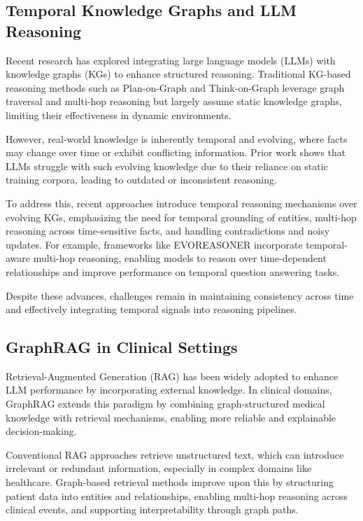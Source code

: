 \documentclass[conference]{IEEEtran}
\begin{document}
\subsection{Temporal Knowledge Graphs and LLM Reasoning}
Recent research has explored integrating large language models (LLMs) with knowledge graphs (KGs) to enhance structured reasoning. Traditional KG-based reasoning methods such as Plan-on-Graph and Think-on-Graph leverage graph traversal and multi-hop reasoning but largely assume static knowledge graphs, limiting their effectiveness in dynamic environments.

However, real-world knowledge is inherently temporal and evolving, where facts may change over time or exhibit conflicting information. Prior work shows that LLMs struggle with such evolving knowledge due to their reliance on static training corpora, leading to outdated or inconsistent reasoning.

To address this, recent approaches introduce temporal reasoning mechanisms over evolving KGs, emphasizing the need for temporal grounding of entities, multi-hop reasoning across time-sensitive facts, and handling contradictions and noisy updates. For example, frameworks like EVOREASONER incorporate temporal-aware multi-hop reasoning, enabling models to reason over time-dependent relationships and improve performance on temporal question answering tasks.

Despite these advances, challenges remain in maintaining consistency across time and effectively integrating temporal signals into reasoning pipelines.

\subsection{GraphRAG in Clinical Settings}
Retrieval-Augmented Generation (RAG) has been widely adopted to enhance LLM performance by incorporating external knowledge. In clinical domains, GraphRAG extends this paradigm by combining graph-structured medical knowledge with retrieval mechanisms, enabling more reliable and explainable decision-making.

Conventional RAG approaches retrieve unstructured text, which can introduce irrelevant or redundant information, especially in complex domains like healthcare. Graph-based retrieval methods improve upon this by structuring patient data into entities and relationships, enabling multi-hop reasoning across clinical events, and supporting interpretability through graph paths.
\end{document}
